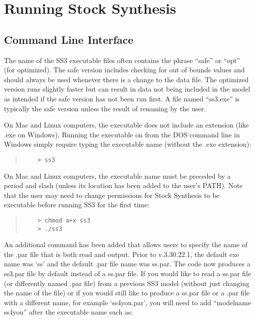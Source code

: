 \section{Running Stock Synthesis} \label{sec:RunningSS3}

\subsection{Command Line Interface}
The name of the SS3 executable files often contains the phrase ``safe'' or ``opt'' (for optimized). The safe version includes checking for out of bounds values and should always be used whenever there is a change to the data file. The optimized version runs slightly faster but can result in data not being included in the model as intended if the safe version has not been run first. A file named ``ss3.exe'' is typically the safe version unless the result of renaming by the user.

On Mac and Linux computers, the executable does not include an extension (like .exe on Windows).
Running the executable on from the DOS command line in Windows simply require typing the executable name (without the .exe extension):
\begin{quote}
	\begin{verbatim}
	> ss3
	\end{verbatim}
\end{quote}


On Mac and Linux computers, the executable name must be preceded by a period and slash (unless its location has been added to the user's PATH). Note that the user may need to change permissions for Stock Synthesis to be executable before running SS3 for the first time:

\begin{quote}
	\begin{verbatim}
	> chmod a+x ss3
	> ./ss3
	\end{verbatim}
\end{quote}

An additional command has been added that allows users to specify the name of the .par file that is both read and output. Prior to v.3.30.22.1, the default exe name was `ss' and the default .par file name was ss.par. The code now produces a ss3.par file by default instead of a ss.par file. If you would like to read a ss.par file (or differently named .par file) from a previous SS3 model (without just changing the name of the file) or if you would still like to produce a ss.par file or a .par file with a different name, for example `ss4you.par', you will need to add ``modelname ss4you'' after the executable name such as:

